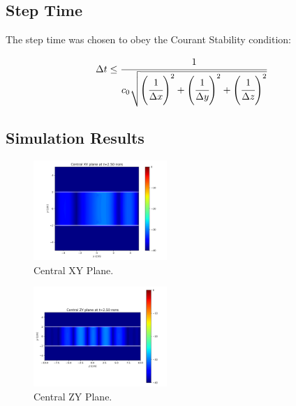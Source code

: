 \subsection{Step Time}

The step time was chosen to obey the Courant Stability condition:

\begin{equation}
    \dt \leq \cfrac{1}{c_0\sqrt{\pare{\cfrac{1}{\dx}}^2 + \pare{\cfrac{1}{\dy}}^2 + \pare{\cfrac{1}{\dz}}^2}}
\end{equation}

\subsection{Simulation Results}

\begin{figure}[H]
    \centering
    \includegraphics[width=0.45\textwidth]{contents/central_xy_plane.png}
    \caption{Central XY Plane.}
\end{figure}

\begin{figure}[H]
    \centering
    \includegraphics[width=0.45\textwidth]{contents/central_zy_plane.png}
    \caption{Central ZY Plane.}
\end{figure}